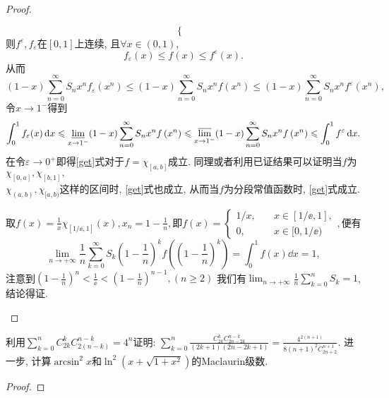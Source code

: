 \begin{quizb}
\begin{proof}
\begin{asparaenum}[\bfseries (1)]
\[\begin{cases}
\end{cases}\]则\(f^\varepsilon,f_\varepsilon\)在\([0,1]\)上连续, 且\(\forall x\in(0,1)\),\[f_\varepsilon(x)\leqslant f(x)\leqslant f^\varepsilon(x).\]从而\[(1-x)\sum_{n=0}^{\infty}S_nx^nf_\varepsilon\left(x^n\right)\leqslant (1-x)\sum_{n=0}^{\infty}S_nx^nf\left(x^n\right)\leqslant (1-x)\sum_{n=0}^{\infty}S_nx^nf^\varepsilon\left(x^n\right),\]令\(x\rightarrow 1^-\)得到\[\int_{0}^{1}f_\varepsilon(x)\,\mathrm{d} x\leqslant\varliminf_{x\rightarrow 1^-}(1-x)\sum_{n=0}^{\infty}S_nx^nf\left(x^n\right)\leqslant\varlimsup_{x\rightarrow 1^-}(1-x)\sum_{n=0}^{\infty}S_nx^nf\left(x^n\right)\leqslant\int_{0}^{1}f^\varepsilon\,\mathrm{d} x.\]在令\(\varepsilon\rightarrow 0^+\)即得\eqref{get}式对于\(f=\chi_{[a,b]}\)成立. 同理或者利用已证结果可以证明当\(f\)为\(\chi_{[0,a]},\chi_{[b,1]},\)\\\(\chi_{(a,b)},\chi_{[a,b)}\)这样的区间时, \eqref{get}式也成立, 从而当\(f\)为分段常值函数时, \eqref{get}式成立.
\item 取\(f(x)=\frac{1}{x}\chi_{[1/\ee,1]}(x), x_n=1-\frac{1}{n},\)即\(f(x)=\begin{cases}
1/x,\quad&x\in[1/\ee,1],\\
0,&x\in[0,1/\ee)
\end{cases},\)便有\[\lim_{n\rightarrow+\infty}\frac{1}{n}\sum_{k=0}^{\infty}S_k\left(1-\frac{1}{n}\right)^kf\left(\left(1-\frac{1}{n}\right)^k\right)=\int_{0}^{1}f(x)\dd x=1,\]注意到\(\left(1-\frac{1}{n}\right)^n<\frac{1}{\ee}<\left(1-\frac{1}{n}\right)^{n-1},(n\geqslant 2)\) 我们有\(\lim_{n\rightarrow+\infty}\frac{1}{n}\sum_{k=0}^{n}S_k=1\), 结论得证.\qedhere
\end{asparaenum}
\end{proof}
\woe  利用\(\sum_{k=0}^{n}C_{2k}^kC_{2(n-k)}^{n-k}=4^n\)证明: \(\sum_{k=0}^{n}\frac{C_{2k}^kC_{2n-2k}^{n-k}}{(2k+1)(2n-2k+1)}=\frac{4^{2(n+1)}}{8(n+1)^2C_{2n+2}^{n+1}}\). 进一步, 计算\(\arcsin^2x\)和\(\ln^2(x+\sqrt{1+x^2})\)的Maclaurin级数.
\begin{proof}


\end{proof}
\end{quizb}

